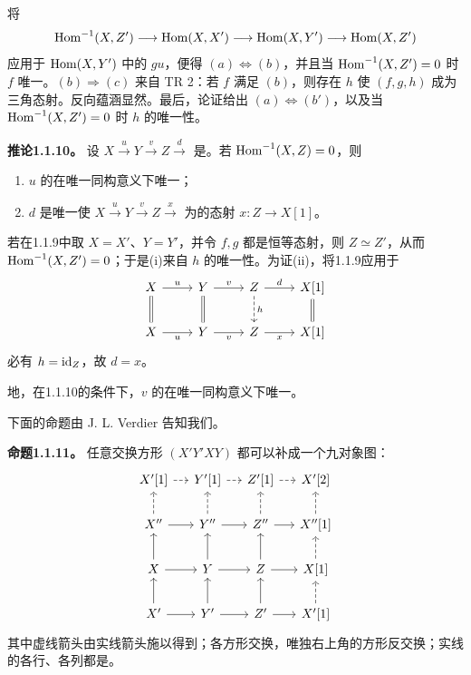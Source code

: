 将
\[
 \operatorname{Hom}^{-1}(X,Z')\longrightarrow\operatorname{Hom}(X,X')\longrightarrow\operatorname{Hom}(X,Y')\longrightarrow\operatorname{Hom}(X,Z')
\]
应用于 $\operatorname{Hom}(X,Y')$ 中的 $gu$，便得 $(a)\Longleftrightarrow(b)$，并且当 $\operatorname{Hom}^{-1}(X,Z')=0$ 时 $f$ 唯一。$(b)\Longrightarrow(c)$ 来自 TR 2：若 $f$ 满足 $(b)$，则存在 $h$ 使
$(f,g,h)$ 成为三角态射。反向蕴涵显然。最后，论证给出 $(a)\Longleftrightarrow(b')$，以及当 $\operatorname{Hom}^{-1}(X,Z')=0$ 时 $h$ 的唯一性。

\par\medskip\noindent\textbf{推论1.1.10。} 设 $X\xrightarrow{u}Y\xrightarrow{v}Z\xrightarrow{d}$ 是。若 $\operatorname{Hom}^{-1}(X,Z)=0$，则
\begin{enumerate}[label=(\roman*)]
\item $u$ 的在唯一同构意义下唯一；
\item $d$ 是唯一使 $X\xrightarrow{u}Y\xrightarrow{v}Z\xrightarrow{x}$ 为的态射 $x:Z\to X[1]$。
\end{enumerate}
若在1.1.9中取 $X=X'$、$Y=Y'$，并令 $f,g$ 都是恒等态射，则 $Z\simeq Z'$，从而 $\operatorname{Hom}^{-1}(X,Z')=0$；于是(i)来自 $h$ 的唯一性。为证(ii)，将1.1.9应用于
\[
\begin{tikzcd}[ampersand replacement=\&]
X\arrow[r,"{u}"]\arrow[d,equal]\&Y\arrow[r,"{v}"]\arrow[d,equal]\&Z\arrow[r,"{d}"]\arrow[d,dashed,"{h}"]\&X[1]\arrow[d,equal]\\
X\arrow[r,"{u}"']\&Y\arrow[r,"{v}"']\&Z\arrow[r,"{x}"']\&X[1]
\end{tikzcd}
\]
必有 $h=\operatorname{id}_Z$，故 $d=x$。

地，在1.1.10的条件下，$v$ 的在唯一同构意义下唯一。

下面的命题由 J. L. Verdier 告知我们。

\par\medskip\noindent\textbf{命题1.1.11。} 任意交换方形 $(X'Y'XY)$ 都可以补成一个九对象图：
\[
\begin{tikzcd}[ampersand replacement=\&,column sep=small]
X'[1]\arrow[r,dashed]\&Y'[1]\arrow[r,dashed]\&Z'[1]\arrow[r,dashed]\&X'[2]\\
X''\arrow[u,dashed]\arrow[r]\&Y''\arrow[u,dashed]\arrow[r]\&Z''\arrow[u,dashed]\arrow[r]\&X''[1]\arrow[u,dashed]\\
X\arrow[u]\arrow[r]\&Y\arrow[u]\arrow[r]\&Z\arrow[u]\arrow[r]\&X[1]\arrow[u,dashed]\\
X'\arrow[u]\arrow[r]\&Y'\arrow[u]\arrow[r]\&Z'\arrow[u]\arrow[r]\&X'[1]\arrow[u,dashed]
\end{tikzcd}
\]
其中虚线箭头由实线箭头施以得到；各方形交换，唯独右上角的方形反交换；实线的各行、各列都是。

